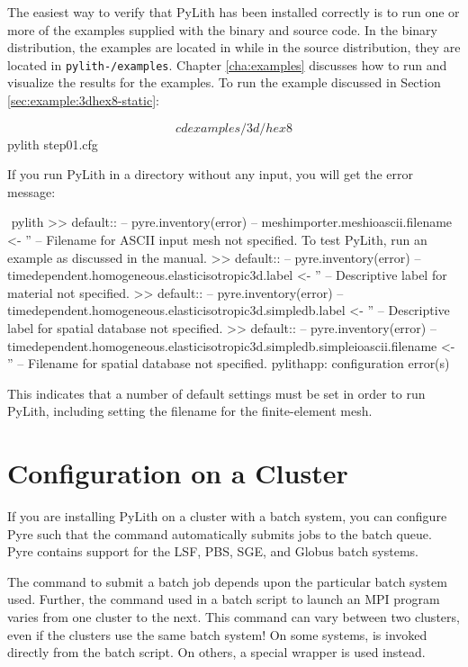 The easiest way to verify that PyLith has been installed correctly is
to run one or more of the examples supplied with the binary and source
code. In the binary distribution, the examples are located in
 while in the source distribution,
they are located in \texttt{pylith-\pylithVersionNumber/examples}. Chapter
\vref{cha:examples} discusses how to run and visualize the results
for the examples. To run the example discussed in Section
\vref{sec:example:3dhex8-static}:
\begin{shell}
$$ cd examples/3d/hex8
$$ pylith step01.cfg
\end{shell}
If you run PyLith in a directory without any input, you will get the
error message:
\begin{shell}
$$ pylith
 >> {default}::
 -- pyre.inventory(error)
 -- meshimporter.meshioascii.filename <- ''
 -- Filename for ASCII input mesh not specified.
    To test PyLith, run an example as discussed in the manual.
 >> {default}::
 -- pyre.inventory(error)
 -- timedependent.homogeneous.elasticisotropic3d.label <- ''
 -- Descriptive label for material not specified.
 >> {default}::
 -- pyre.inventory(error)
 -- timedependent.homogeneous.elasticisotropic3d.simpledb.label <- ''
 -- Descriptive label for spatial database not specified.
 >> {default}::
 -- pyre.inventory(error)
 -- timedependent.homogeneous.elasticisotropic3d.simpledb.simpleioascii.filename <- ''
 -- Filename for spatial database not specified.
pylithapp: configuration error(s)
\end{shell}
This indicates that a number of default settings must be set in order
to run PyLith, including setting the filename for the finite-element
mesh.


\section{Configuration on a Cluster}

If you are installing PyLith on a cluster with a batch system, you can
configure Pyre such that the  command automatically
submits jobs to the batch queue. Pyre contains support for the LSF,
PBS, SGE, and Globus batch systems.

The command to submit a batch job depends upon the particular batch
system used. Further, the command used in a batch script to launch an
MPI program varies from one cluster to the next. This command can vary
between two clusters, even if the clusters use the same batch system!
On some systems,  is invoked directly from the batch
script. On others, a special wrapper is used instead.

